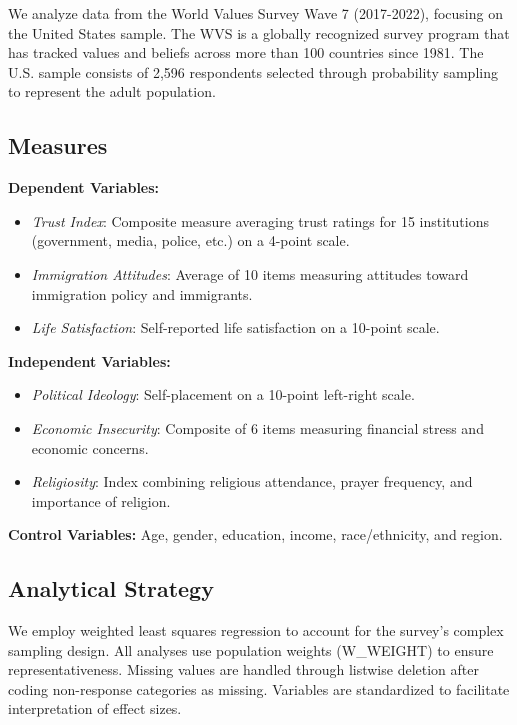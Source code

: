 \documentclass[12pt,a4paper]{article}
\begin{document}
We analyze data from the World Values Survey Wave 7 (2017-2022), focusing on the 
United States sample. The WVS is a globally recognized survey program that has 
tracked values and beliefs across more than 100 countries since 1981. The U.S. 
sample consists of 2,596 respondents selected through probability sampling to 
represent the adult population.

\subsection{Measures}

\textbf{Dependent Variables:}
\begin{itemize}
\item \textit{Trust Index}: Composite measure averaging trust ratings for 15 
institutions (government, media, police, etc.) on a 4-point scale.
\item \textit{Immigration Attitudes}: Average of 10 items measuring attitudes 
toward immigration policy and immigrants.
\item \textit{Life Satisfaction}: Self-reported life satisfaction on a 10-point 
scale.
\end{itemize}

\textbf{Independent Variables:}
\begin{itemize}
\item \textit{Political Ideology}: Self-placement on a 10-point left-right scale.
\item \textit{Economic Insecurity}: Composite of 6 items measuring financial stress 
and economic concerns.
\item \textit{Religiosity}: Index combining religious attendance, prayer frequency, 
and importance of religion.
\end{itemize}

\textbf{Control Variables:} Age, gender, education, income, race/ethnicity, and 
region.

\subsection{Analytical Strategy}

We employ weighted least squares regression to account for the survey's complex 
sampling design. All analyses use population weights (W\_WEIGHT) to ensure 
representativeness. Missing values are handled through listwise deletion after 
coding non-response categories as missing. Variables are standardized to facilitate 
interpretation of effect sizes.
\end{document}
